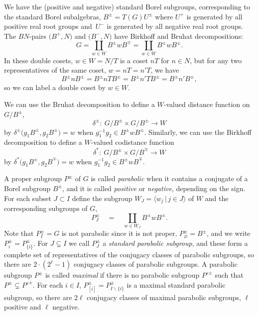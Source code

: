 \documentclass[pdftex]{sigma}
\numberwithin{equation}{section}
\def\la{\langle}
\def\ra{\rangle}
\begin{document}
We have the (positive and negative) standard Borel subgroups, corresponding to the standard Borel subalgebras, $B^{\pm}=T(G)U^{\pm}$ where $U^{+}$ is generated by all positive real root groups and~$U^-$ is generated by all negative real root groups. The $BN$-pairs $\big(B^+,N\big)$ and $\big(B^-,N\big)$ have Birkhoff and Bruhat decompositions:
\[G = \coprod_{w\in W} B^{\pm}wB^{\mp} = \coprod_{w\in W}B^{\pm}wB^{\pm}.\]
In these double cosets, $w\in W = N/T$ is a coset $nT$ for $n\in N$, but for any two representatives of the same coset, $w = nT = n'T$, we have
\[B^{\pm}nB^{\pm} = B^{\pm}nTB^{\pm} = B^{\pm}n'TB^{\pm} = B^{\pm}n'B^{\pm},\]
so we can label a double coset by $w\in W$.

We can use the Bruhat decomposition to define a $W$-valued distance function on $G/B^\pm$,
\[\delta^\pm \colon \ G/B^\pm \times G/B^\pm \to W\]
by $\delta^\pm\big(g_1 B^\pm, g_2 B^\pm\big) = w$ when $g_1^{-1} g_2 \in B^{\pm}wB^{\pm}$. Similarly, we can use the
Birkhoff decomposition to define a $W$-valued codistance function
\[\delta^* \colon \ G/B^\pm \times G/B^\mp \to W\]
by $\delta^*\big(g_1 B^\pm, g_2 B^\mp\big) = w$ when $g_1^{-1} g_2 \in B^{\pm}wB^{\mp}$.

A proper subgroup $P^{\pm}$ of $G$ is called {\em parabolic} when it contains a conjugate of a Borel subgroup $B^{\pm}$, and it is called \emph{positive} or \emph{negative}, depending on the sign. For each subset $J\subset I$ define the subgroup
 $W_J = \la w_j \, |\, j\in J\ra$ of $W$ and the corresponding subgroups of $G$,
\[P_J^\pm\quad = \quad \coprod_{w\in W_J}B^{\pm}wB^{\pm} .\]
Note that $P_I^\pm = G$ is not parabolic since it is not proper,
$P_{\varnothing}^\pm = B^{\pm}$, and we write $P_i^\pm = P_{\{i\}}^\pm$. For $J\subsetneq I$ we
call $P_J^\pm$ a {\em standard parabolic subgroup}, and these form a complete set of representatives of the conjugacy classes of parabolic subgroups, so there are $2\cdot (2^\ell-1)$ conjugacy classes of parabolic subgroups. A parabolic subgroup $P^{\pm}$ is called \emph{maximal} if there is no parabolic subgroup $P'^{\pm}$ such that $P^{\pm}\subsetneq P'^{\pm}$. For each $i\in I$,
$P_{[i]}^\pm = P_{I\backslash\{i\}}^\pm$ is a maximal standard parabolic subgroup, so there are $2\ell$ conjugacy classes of maximal parabolic subgroups, $\ell$ positive and $\ell$ negative.
\end{document}
